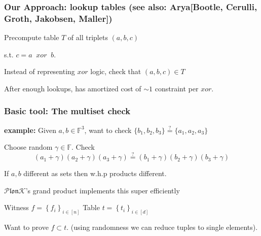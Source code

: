 \documentclass[shadesubsections,compress,14pt,mathserif]{beamer}
\newcommand{\xor}{\ensuremath{xor}}
\newcommand{\plonk}{\ensuremath{\mathcal{P} \mathfrak{lon}\mathcal{K}}}
\newcommand{\F}{\ensuremath{\mathbb F}}
\newcommand{\sett}[2]{\ensuremath{\left\{#1\right\}_{#2}}}
\begin{document}
\begin{frame}
 \frametitle{Our Approach: lookup tables {\normalsize (see also: Arya{\footnotesize [Bootle, Cerulli, Groth, Jakobsen, Maller]})}}
 
 
 Precompute table $T$ of all triplets $(a,b,c)$
  
  s.t. $c=a\;\;\xor\;\;b$.\pause
  
    \vspace{0.2in}

Instead of representing
$\xor$ logic, check that $(a,b,c)\in T$\pause
    \vspace{0.2in}
  
After enough lookups, has amortized cost of $\sim 1$ constraint per $\xor$.

    
\end{frame}



\begin{frame}
 
\end{frame}

 
\begin{frame}
\frametitle{Basic tool: The multiset check}
\textbf{example:} Given $a,b\in \F^3$, want to check $\{b_1,b_2,b_3\} \stackrel{?}{=} \{a_1,a_2,a_3\}$ \\ \pause
 \vspace{0.2in}

  
 Choose random $\gamma\in \F$. Check
  \[(a_1 + \gamma)(a_2+ \gamma)(a_3 + \gamma) \stackrel{?}{=} (b_1+\gamma)(b_2+\gamma)(b_3+\gamma)\]\pause

 \vspace{0.2in}
 If $a,b$ different as sets then w.h.p products different.\pause
 
  \vspace{0.2in}

 \plonk's grand product implements this super efficiently
\end{frame}



\begin{frame}
Witness $f=\sett{f_i}{i\in [n]}$
Table $t=\sett{t_i}{i\in [d]}$

Want to prove $f\subset t$.
{\small (using randomness we can reduce tuples to single elements)}.
\end{frame}
\end{document}
